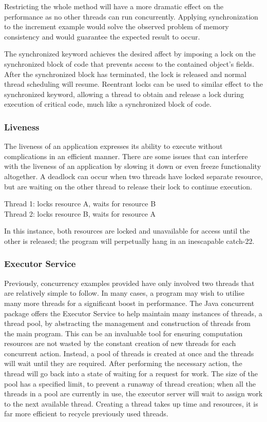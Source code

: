 \documentclass[a4paper,12pt]{article}
\begin{document}
Restricting the whole method will have a more dramatic effect on the performance as no other threads can run concurrently. Applying synchronization to the increment example would solve the observed problem of memory consistency and would guarantee the expected result to occur.

The synchronized keyword achieves the desired affect by imposing a lock on the synchronized block of code that prevents access to the contained object’s fields. After the synchronized block has terminated, the lock is released and normal thread scheduling will resume. Reentrant locks can be used to similar effect to the synchronized keyword, allowing a thread to obtain and release a lock during execution of critical code, much like a synchronized block of code. 

\subsubsection{Liveness}
The liveness of an application expresses its ability to execute without complications in an efficient manner. There are some issues that can interfere with the liveness of an application by slowing it down or even freeze functionality altogether. A deadlock can occur when two threads have locked separate resource, but are waiting on the other thread to release their lock to continue execution. 

\vspace{2pt}
\begin{center}
\noindent Thread 1: locks resource A, waits for resource B
\\Thread 2: locks resource B, waits for resource A 
\end{center}
\vspace{2pt}

In this instance, both resources are locked and unavailable for access until the other is released; the program will perpetually hang in an inescapable catch-22.  


\subsubsection{Executor Service}
Previously, concurrency examples provided have only involved two threads that are relatively simple to follow. In many cases, a program may wish to utilise many more threads for a significant boost in performance. The Java concurrent package offers the Executor Service to help maintain many instances of threads, a thread pool, by abstracting the management and construction of threads from the main program. This can be an invaluable tool for ensuring computation resources are not wasted by the constant creation of new threads for each concurrent action. Instead, a pool of threads is created at once and the threads will wait until they are required. After performing the necessary action, the thread will go back into a state of waiting for a request for work. The size of the pool has a specified limit, to prevent a runaway of thread creation; when all the threads in a pool are currently in use, the executor server will wait to assign work to the next available thread. Creating a thread takes up time and resources, it is far more efficient to recycle previously used threads. 
\end{document}

